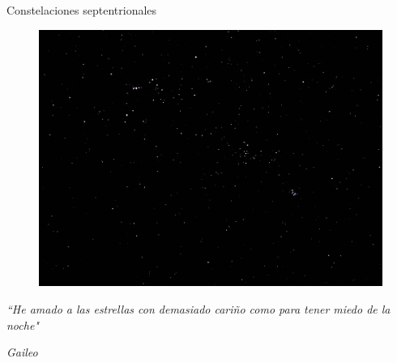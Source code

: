 \documentclass{beamer}
\begin{document}
\begin{frame}{Constelaciones septentrionales}
 \begin{figure}
   \centering
   \includegraphics[scale=0.2]{Imagenes/Orion}
  \end{figure}
\end{frame}

\begin{frame}
\begin{center}
\Huge 
\textit{``He amado a las estrellas con demasiado cariño como para tener miedo de la noche"}
\end{center}
\begin{flushright}
\small
\textit{Gaileo}
\end{flushright}
\end{frame}
\end{document}
